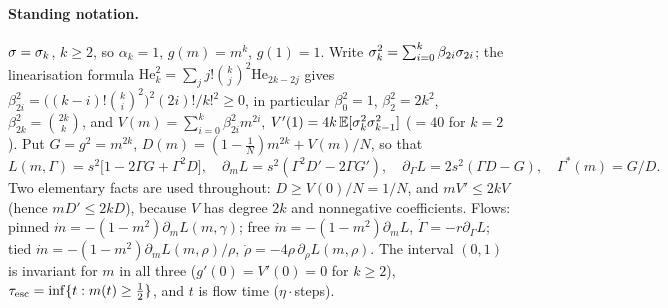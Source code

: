 \makeatletter
{}
\makeatother

\paragraph{Standing notation.} $\sigma=\sigma_k$, $k\ge2$, so $\alpha_k=1$, $g(m)=m^k$, $g(1)=1$. Write $\sigma_k^2=\sum_{i=0}^k\beta_{2i}\sigma_{2i}$; the
linearisation formula $\mathrm{He}_k^2=\sum_{j}j!\binom kj^2\mathrm{He}_{2k-2j}$ gives
$\beta_{2i}^2=\big((k-i)!\binom k{i}^2\big)^2(2i)!/k!^2\ge0$, in particular $\beta_0^2=1$, $\beta_2^2=2k^2$, $\beta_{2k}^2=\binom{2k}k$, and
$V(m)=\sum_{i=0}^k\beta_{2i}^2m^{2i}$, $V'(1)=4k\,\mathbb{E}[\sigma_k^2\sigma_{k-1}^2]$ ($=40$ for $k=2$). Put $G=g^2=m^{2k}$, $D(m)=(1-\frac1N)m^{2k}+V(m)/N$, so that
\[
L(m,\Gamma)=s^2\big[1-2\Gamma G+\Gamma^2D\big],\quad \partial_mL=s^2(\Gamma^2D'-2\Gamma G'),\quad \partial_\Gamma L=2s^2(\Gamma D-G),\quad \Gamma^*(m)=G/D .
\]
Two elementary facts are used throughout: $D\ge V(0)/N=1/N$, and $mV'\le2kV$ (hence $mD'\le2kD$), because $V$ has degree $2k$ and
nonnegative coefficients. Flows: pinned $\dot m=-(1-m^2)\partial_mL(m,\gamma)$; free $\dot m=-(1-m^2)\partial_mL$, $\dot\Gamma=-r\partial_\Gamma L$;
tied $\dot m=-(1-m^2)\partial_mL(m,\rho)/\rho$, $\dot\rho=-4\rho\,\partial_\rho L(m,\rho)$. The interval $(0,1)$ is invariant for $m$ in all three
($g'(0)=V'(0)=0$ for $k\ge2$), $\tau_{\rm esc}=\inf\{t:m(t)\ge\frac12\}$, and $t$ is flow time ($\eta\cdot$steps).

